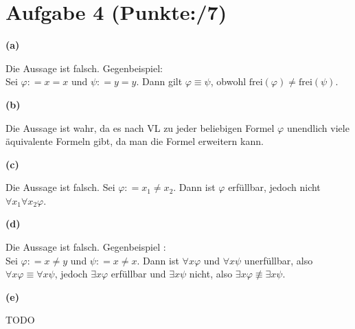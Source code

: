 \documentclass[11pt, a4paper]{article}
\newcommand{\ppp}{7}
\newcommand{\defgr}{\mathrel{\mathop:\!\!=}}
\begin{document}
\section*{Aufgabe 4 (Punkte:\qquad/\ppp)}
\textbf{(a)}
\begin{adjustwidth}{20pt}{20pt}
Die Aussage ist falsch. Gegenbeispiel:\\
Sei $\varphi \defgr x=x$ und 	$\psi \defgr y=y$. Dann gilt $\varphi \equiv \psi$, obwohl $\text{frei}(\varphi) \neq \text{frei}(\psi)$.
\end{adjustwidth}
\textbf{(b)}
\begin{adjustwidth}{20pt}{20pt}
Die Aussage ist wahr, da es nach VL zu jeder beliebigen Formel $\varphi$ unendlich viele äquivalente Formeln gibt, da man die Formel erweitern kann. 
\end{adjustwidth}
\textbf{(c)}
\begin{adjustwidth}{20pt}{20pt}
Die Aussage ist falsch. Sei $\varphi \defgr x_1 \neq x_2$. Dann ist $\varphi$ erfüllbar, jedoch nicht $\forall x_1 \forall x_2 \varphi$.
\end{adjustwidth}
\textbf{(d)}
\begin{adjustwidth}{20pt}{20pt}
Die Aussage ist falsch. Gegenbeispiel	:\\
Sei $\varphi \defgr x \neq y$ und $\psi \defgr x \neq x$. Dann ist $\forall x \varphi$ und $\forall x \psi$ unerfüllbar, also $\forall x \varphi \equiv \forall x \psi$, jedoch $\exists x \varphi$ erfüllbar und $\exists x \psi$ nicht, also $\exists x \varphi \not \equiv \exists x \psi$.
\end{adjustwidth}
\textbf{(e)}
\begin{adjustwidth}{20pt}{20pt}
TODO
\end{adjustwidth}
\end{document}
